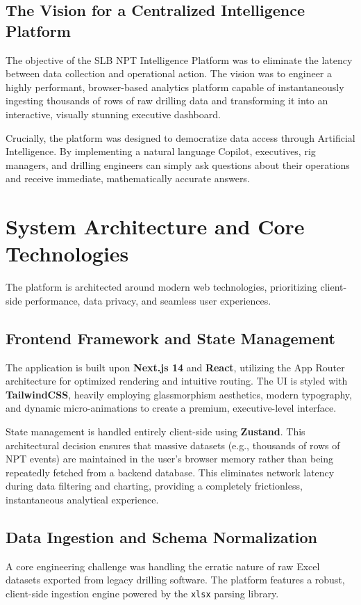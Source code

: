 \documentclass[11pt,a4paper]{article}
\begin{document}
\subsection{The Vision for a Centralized Intelligence Platform}
The objective of the SLB NPT Intelligence Platform was to eliminate the latency between data collection and operational action. The vision was to engineer a highly performant, browser-based analytics platform capable of instantaneously ingesting thousands of rows of raw drilling data and transforming it into an interactive, visually stunning executive dashboard. 

Crucially, the platform was designed to democratize data access through Artificial Intelligence. By implementing a natural language Copilot, executives, rig managers, and drilling engineers can simply ask questions about their operations and receive immediate, mathematically accurate answers.

\section{System Architecture and Core Technologies}
The platform is architected around modern web technologies, prioritizing client-side performance, data privacy, and seamless user experiences.

\subsection{Frontend Framework and State Management}
The application is built upon \textbf{Next.js 14} and \textbf{React}, utilizing the App Router architecture for optimized rendering and intuitive routing. The UI is styled with \textbf{TailwindCSS}, heavily employing glassmorphism aesthetics, modern typography, and dynamic micro-animations to create a premium, executive-level interface.

State management is handled entirely client-side using \textbf{Zustand}. This architectural decision ensures that massive datasets (e.g., thousands of rows of NPT events) are maintained in the user's browser memory rather than being repeatedly fetched from a backend database. This eliminates network latency during data filtering and charting, providing a completely frictionless, instantaneous analytical experience.

\subsection{Data Ingestion and Schema Normalization}
A core engineering challenge was handling the erratic nature of raw Excel datasets exported from legacy drilling software. The platform features a robust, client-side ingestion engine powered by the \texttt{xlsx} parsing library. 
\end{document}
